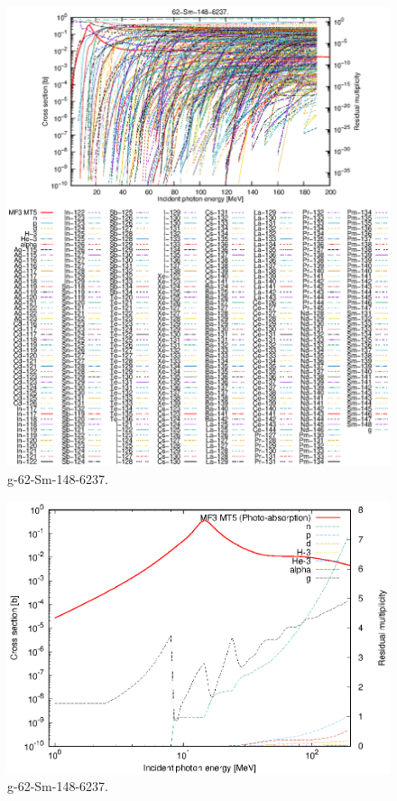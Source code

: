 \begin{figure}
 \includegraphics[width=\linewidth]{eps/g_62-Sm-148_6237.eps}
  \caption{g-62-Sm-148-6237.}
\end{figure}
\newpage \clearpage

\begin{figure}
 \includegraphics[width=\linewidth]{eps-log/g_62-Sm-148_6237.eps}
 \caption{g-62-Sm-148-6237.}
\end{figure}
\newpage \clearpage

